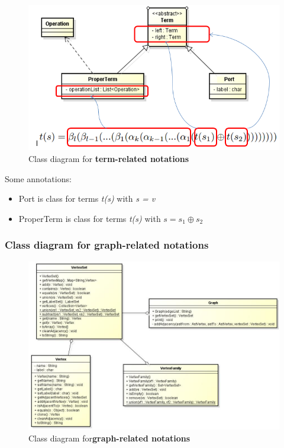 \documentclass[a4paper, 12pt]{article}
\begin{document}
\begin{figure}[H]

\begin{centering}
\includegraphics[scale=0.6]{image/classdiagram1}
\caption{Class diagram for \textbf {term-related notations}}
\par\end{centering}

\end{figure}
Some annotations:
\begin{itemize}
\item Port is class for terms \textit {t(s)} with \textit {s = v}
\item ProperTerm is class for terms \textit {t(s)} with $s=s_{1}\oplus s_{2}$
\end{itemize}

\subsubsection{Class diagram for graph-related notations}

\begin{figure}[H]
\centering{}
\includegraphics[scale=0.6]{image/classdiagram2.png}
\caption{Class diagram for\textbf {graph-related notations}}
\end{figure}
\end{document}
